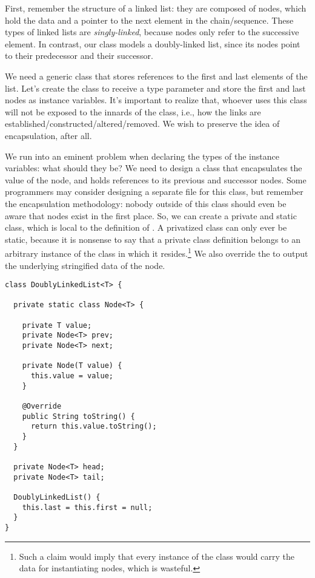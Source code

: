 First, remember the structure of a linked list: they are composed of nodes, which hold the data and a pointer to the next element in the chain/sequence. These types of linked lists are \emph{singly-linked}, because nodes only refer to the successive element. In contrast, our class models a doubly-linked list, since its nodes point to their predecessor and their successor. 

We need a generic class that stores references to the first and last elements of the list. Let's create the  class to receive a type parameter  and store the first and last nodes as instance variables. It's important to realize that, whoever uses this class will not be exposed to the innards of the class, i.e., how the links are established/constructed/altered/removed. We wish to preserve the idea of encapsulation, after all.

We run into an eminent problem when declaring the types of the instance variables: what should they be? We need to design a class that encapsulates the value of the node, and holds references to its previous and successor nodes. Some programmers may consider designing a separate  file for this class, but remember the encapsulation methodology: nobody outside of this class should even be aware that nodes exist in the first place. So, we can create a private and static  class, which is local to the definition of . A privatized class can only ever be static, because it is nonsense to say that a private class definition belongs to an arbitrary instance of the class in which it resides.\footnote{Such a claim would imply that every instance of the  class would carry the data for instantiating nodes, which is wasteful.} We also override the  to output the underlying stringified data of the node.

\begin{lstlisting}[language=MyJava]
class DoublyLinkedList<T> {

  private static class Node<T> {

    private T value;
    private Node<T> prev;
    private Node<T> next;

    private Node(T value) { 
      this.value = value; 
    }

    @Override
    public String toString() {
      return this.value.toString();
    }
  }

  private Node<T> head;
  private Node<T> tail;

  DoublyLinkedList() {
    this.last = this.first = null;
  }
}
\end{lstlisting}

